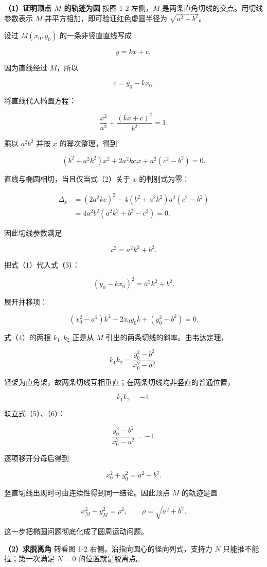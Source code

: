 \documentclass[12pt,a4paper,UTF8]{ctexart}
\begin{document}
\textbf{（1）证明顶点 \(M\) 的轨迹为圆} 按图 1-2 左侧，\(M\)
是两条直角切线的交点。用切线参数表示 \(M\)
并平方相加，即可验证红色虚圆半径为 \(\sqrt{a^2+b^2}\)。

设过 \(M(x_0,y_0)\) 的一条非竖直直线写成

\[y=kx+c,\]

因为直线经过 \(M\)，所以

\[c=y_0-kx_0.\]

将直线代入椭圆方程：

\[\frac{x^2}{a^2}+\frac{(kx+c)^2}{b^2}=1.\]

乘以 \(a^2b^2\) 并按 \(x\) 的幂次整理，得到

\[\left(b^2+a^2k^2\right)x^2+2a^2kc\,x+a^2(c^2-b^2)=0.\]

直线与椭圆相切，当且仅当式（2）关于 \(x\) 的判别式为零：

\[\begin{aligned}
\Delta_x
&=(2a^2kc)^2-4(b^2+a^2k^2)a^2(c^2-b^2)\\
&=4a^2b^2\left(a^2k^2+b^2-c^2\right)=0.
\end{aligned}\]

因此切线参数满足

\[c^2=a^2k^2+b^2.\]

把式（1）代入式（3）：

\[\left(y_0-kx_0\right)^2=a^2k^2+b^2.\]

展开并移项：

\[\left(x_0^2-a^2\right)k^2-2x_0y_0k+\left(y_0^2-b^2\right)=0.\]

式（4）的两根 \(k_1,k_2\) 正是从 \(M\)
引出的两条切线的斜率。由韦达定理，

\[k_1k_2=\frac{y_0^2-b^2}{x_0^2-a^2}.\]

轻架为直角架，故两条切线互相垂直；在两条切线均非竖直的普通位置，

\[k_1k_2=-1.\]

联立式（5）、（6）：

\[\frac{y_0^2-b^2}{x_0^2-a^2}=-1.\]

逐项移开分母后得到

\[x_0^2+y_0^2=a^2+b^2.\]

竖直切线出现时可由连续性得到同一结论。因此顶点 \(M\) 的轨迹是圆

\[\boxed{x_M^2+y_M^2=\rho^2},\qquad \rho=\sqrt{a^2+b^2}.\]

这一步把椭圆问题彻底化成了圆周运动问题。

\textbf{（2）求脱离角} 转看图 1-2 右侧。沿指向圆心的径向列式，支持力
\(N\) 只能推不能拉；第一次满足 \(N=0\) 的位置就是脱离点。
\end{document}
